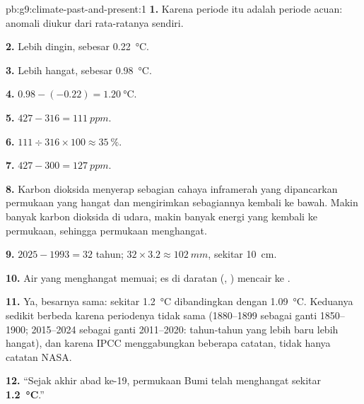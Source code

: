 \begin{solution}{pb:g9:climate-past-and-present:1}
\textbf{1.} Karena periode itu adalah periode acuan: anomali diukur dari
rata-ratanya sendiri.

\textbf{2.} Lebih dingin, sebesar \qty{0.22}{\degreeCelsius}.

\textbf{3.} Lebih hangat, sebesar \qty{0.98}{\degreeCelsius}.

\textbf{4.} $0.98 - (-0.22) = \qty{1.20}{\degreeCelsius}$.

\textbf{5.} $427 - 316 = \qty{111}{ppm}$.

\textbf{6.} $111 \div 316 \times 100 \approx 35~\%$.

\textbf{7.} $427 - 300 = \qty{127}{ppm}$.

\textbf{8.} Karbon dioksida menyerap sebagian cahaya inframerah yang
dipancarkan permukaan yang hangat dan mengirimkan sebagiannya kembali ke
bawah. Makin banyak karbon dioksida di udara, makin banyak energi yang
kembali ke permukaan, sehingga permukaan menghangat.

\textbf{9.} $2025 - 1993 = 32$ tahun; $32 \times 3.2 \approx
\qty{102}{mm}$, sekitar \qty{10}{cm}.

\textbf{10.} Air  yang menghangat memuai; es di daratan (,
) mencair ke .

\textbf{11.} Ya, besarnya sama: sekitar \qty{1.2}{\degreeCelsius}
dibandingkan dengan \qty{1.09}{\degreeCelsius}. Keduanya sedikit berbeda
karena periodenya tidak sama (1880--1899 sebagai ganti 1850--1900;
2015--2024 sebagai ganti 2011--2020: tahun-tahun yang lebih baru lebih
hangat), dan karena IPCC menggabungkan beberapa catatan, tidak hanya
catatan NASA.

\textbf{12.} ``Sejak akhir abad ke-19, permukaan Bumi telah menghangat
sekitar \textbf{\qty{1.2}{\degreeCelsius}}.''
\end{solution}
